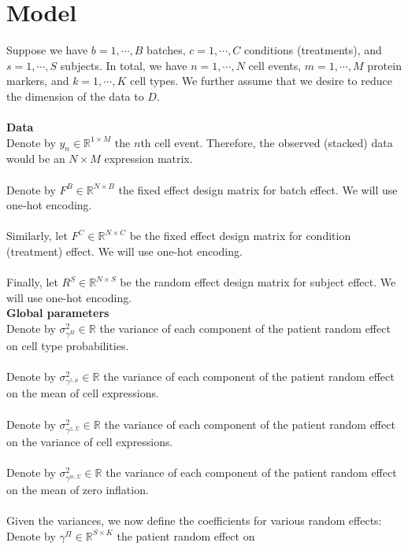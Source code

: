 \documentclass[a4paper]{article}
\begin{document}
\section*{Model}
Suppose we have $b=1, \cdots, B$ batches, $c=1, \cdots, C$ conditions (treatments), and 
$s=1,\cdots, S$ subjects. In total, we have $n=1,\cdots, N$ cell events, 
$m=1,\cdots, M$ protein markers, and $k=1,\cdots, K$ cell types. 
We further assume that we desire to reduce the dimension of the data 
to $D$.\\~\\
\textbf{Data}\\
Denote by $y_n \in \mathbb{R}^{1\times M}$ the $n$th cell event. Therefore, the observed (stacked) data
would be an $N\times M$ expression matrix. \\~\\
Denote by $F^B \in \mathbb{R}^{N\times B}$ the fixed effect design matrix for 
batch effect. We will use one-hot encoding.\\~\\
Similarly, let $F^C \in \mathbb{R}^{N\times C}$ be the fixed effect design matrix for 
condition (treatment) effect. We will use one-hot encoding.\\~\\
Finally, let $R^S \in \mathbb{R}^{N\times S}$ be the random effect design 
matrix for subject effect. We will use one-hot encoding. \\
\textbf{Global parameters}\\
Denote by $\sigma^2_{\gamma^\Pi}\in \mathbb{R}$ the variance of each component of the patient 
random effect on cell type probabilities. \\~\\
Denote by $\sigma^2_{\gamma^{z, \mu}}\in \mathbb{R}$ the variance of each component of the patient 
random effect on the mean of cell expressions. \\~\\
Denote by $\sigma^2_{\gamma^{z, \Sigma}}\in \mathbb{R}$ the variance of each component of the patient 
random effect on the variance of cell expressions. \\~\\
Denote by $\sigma^2_{\gamma^{w, \Sigma}}\in \mathbb{R}$ the variance of each component of the patient 
random effect on the mean of zero inflation. \\~\\
Given the variances, we now define the coefficients for various random effects:\\
Denote by $\gamma^\Pi \in \mathbb{R}^{S\times K}$ the patient random effect on 
\end{document}
